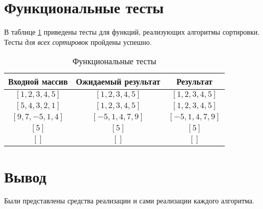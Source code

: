 \section{Функциональные тесты}

В таблице \ref{tbl:functional_test} приведены тесты для функций, реализующих алгоритмы сортировки. Тесты \textit{для всех сортировок} пройдены успешно.


\begin{table}[h]
	\begin{center}
		\begin{threeparttable}
		\captionsetup{singlelinecheck=off, justification=raggedright}
		\caption{\label{tbl:functional_test} Функциональные тесты}
		\begin{tabular}{|c|c|c|}
			\hline
			Входной массив & Ожидаемый результат & Результат \\ 
			\hline
			$[1, 2, 3, 4, 5]$ & $[1, 2, 3, 4, 5]$  & $[1, 2, 3, 4, 5]$\\
			\hline
			$[5, 4, 3, 2, 1]$  & $[1, 2, 3, 4, 5]$ & $[1, 2, 3, 4, 5]$\\
			\hline
			$[9, 7, -5, 1, 4]$  & $[-5, 1, 4, 7, 9]$  & $[-5, 1, 4, 7, 9]$\\
			\hline
			$[5]$  & $[5]$  & $[5]$\\
			\hline
			$[]$  & $[]$  & $[]$\\
			\hline
		\end{tabular}
    \end{threeparttable}
	\end{center}
\end{table}


\section*{Вывод}

Были представлены средства реализации и сами реализации каждого алгоритма.
